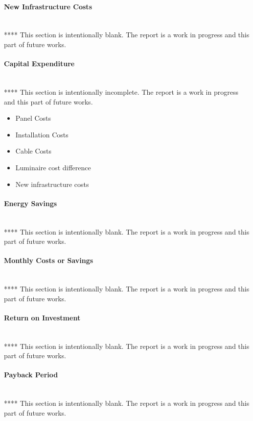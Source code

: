 \paragraph{New Infrastructure Costs}
~\\
****
\newline
This section is intentionally blank. The report is a work in progress and this part of future works.  

\paragraph{Capital Expenditure}
~\\
****
\newline
This section is intentionally incomplete. The report is a work in progress and this part of future works.  

\begin{itemize}[noitemsep,nolistsep]
	\item Panel Costs
	\item Installation Costs
	\item Cable Costs
	\item Luminaire cost difference
	\item New infrastructure costs
\end{itemize}

\paragraph{Energy Savings}
~\\
****
\newline
This section is intentionally blank. The report is a work in progress and this part of future works.  

\paragraph{Monthly Costs or Savings}
~\\
****
\newline
This section is intentionally blank. The report is a work in progress and this part of future works.  

\paragraph{Return on Investment}
~\\
****
\newline
This section is intentionally blank. The report is a work in progress and this part of future works.  

\paragraph{Payback Period}
~\\
****
\newline
This section is intentionally blank. The report is a work in progress and this part of future works.  

